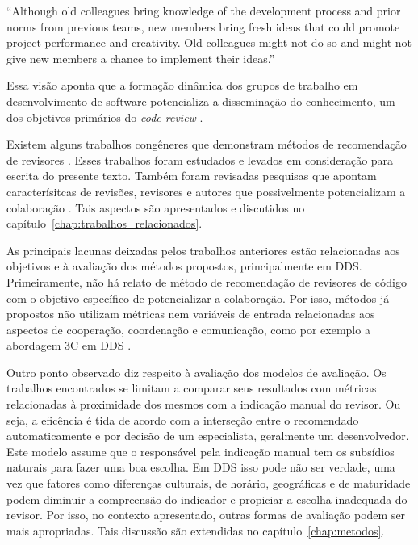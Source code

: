 \documentclass[12pt,openany,oneside,a4paper,english,brazil]{abntbibufjf}
\begin{document}
  \begin{description}
    ``Although old colleagues bring knowledge of the development process and prior norms from previous teams, new members bring fresh ideas that could promote project performance and creativity. Old colleagues might not do so and might not give new members a chance to implement their ideas.''
  \end{description}

  Essa visão aponta que a formação  dinâmica dos grupos de trabalho em desenvolvimento de software potencializa a disseminação do conhecimento, um dos objetivos primários do \textit{code review} \cite{Bacchelli2013}.

  Existem alguns trabalhos congêneres que demonstram métodos de recomendação de revisores \cite{yu2014,Xia2015261,jiang2017}. Esses trabalhos foram estudados e levados em consideração para escrita do presente texto. Também foram revisadas pesquisas que apontam caracterísitcas de revisões, revisores e autores que possivelmente potencializam a colaboração \cite{Kemerer2009,Bird2015191,Baysal2013122}. Tais aspectos são apresentados e discutidos no capítulo~\ref{chap:trabalhos_relacionados}.

  As principais lacunas deixadas pelos trabalhos anteriores estão relacionadas aos objetivos e à avaliação dos métodos propostos, principalmente em DDS. Primeiramente, não há relato de método de recomendação de revisores de código com o objetivo específico de potencializar a colaboração. Por isso, métodos já propostos não utilizam métricas nem variáveis de entrada relacionadas aos aspectos de cooperação, coordenação e comunicação, como por exemplo a abordagem 3C em DDS \cite{fuks2003}.

  Outro ponto observado diz respeito à avaliação dos modelos de avaliação. Os trabalhos encontrados se limitam a comparar seus resultados com métricas relacionadas à proximidade dos mesmos com a indicação manual do revisor. Ou seja, a eficência é tida de acordo com a interseção entre o recomendado automaticamente e por decisão de um especialista, geralmente um desenvolvedor. Este modelo assume que o responsável pela indicação manual tem os subsídios naturais para fazer uma boa escolha. Em DDS isso pode não ser verdade, uma vez que fatores como diferenças culturais, de horário, geográficas e de maturidade podem diminuir a compreensão do indicador e propiciar a escolha inadequada do revisor. Por isso, no contexto apresentado, outras formas de avaliação podem ser mais apropriadas. Tais discussão são extendidas no capítulo~\ref{chap:metodos}.
\end{document}

